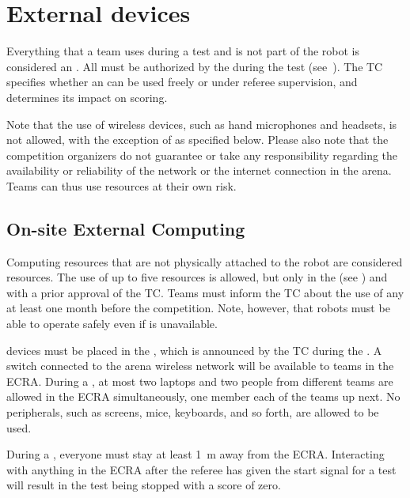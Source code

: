 %
%
\section{External devices}
\label{rule:robot_external_devices}

Everything that a team uses during a test and is not part of the robot is considered an \ExternalDevice.
All \ExternalDevices{} must be authorized by the \TC{} during the \RobotInspection{} test (see~).
The TC specifies whether an \ExternalDevice{} can be used freely or under referee supervision, and determines its impact on scoring.

Note that the use of wireless devices, such as hand microphones and headsets, is not allowed, with the exception of \ExternalComputing{} as specified below.
Please also note that the competition organizers do not guarantee or take any responsibility regarding the availability or reliability of the network or the internet connection in the arena.
Teams can thus use \ExternalComputing{} resources at their own risk.

\subsection{On-site External Computing}

Computing resources that are not physically attached to the robot are considered \ExternalComputing{} resources.
The use of up to five \ExternalComputing{} resources is allowed, but only in the \ArenaNetwork{} (see ) and with a prior approval of the TC.
Teams must inform the TC about the use of any \ExternalComputing{} at least one month before the competition.
Note, however, that robots must be able to operate safely even if \ExternalComputing{} is unavailable.

\ExternalComputing{} devices must be placed in the \ECRA{}, which is announced by the TC during the \SetupDays.
A switch connected to the arena wireless network will be available to teams in the ECRA.
During a \Testblock, at most two laptops and two people from different teams are allowed in the ECRA simultaneously, one member each of the teams up next.
No peripherals, such as screens, mice, keyboards, and so forth, are allowed to be used.

During a \Testslot, everyone must stay at least \SI{1}{\meter} away from the ECRA.
Interacting with anything in the ECRA after the referee has given the start signal for a test will result in the test being stopped with a score of zero.

